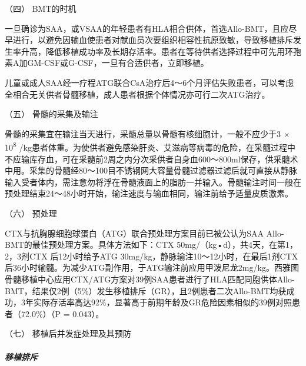 \hypertarget{text00089.htmlux5cux23CHP3-10-1-3-2-4}{}
（四） BMT的时机

一旦确诊为SAA，或VSAA的年轻患者有HLA相合供体，首选Allo-BMT，且应尽早进行，以避免因输血使患者对献血员次要组织相容性抗原致敏，导致移植排斥发生率升高，降低移植成功率及长期存活率。患者在等待供者选择过程中可先用环孢素A加GM-CSF或G-CSF，一旦有合适供者，立即移植。

儿童或成人SAA经一疗程ATG联合CsA治疗后4～6个月评估失败患者，可以考虑全相合无关供者骨髓移植，成人患者根据个体情况亦可行二次ATG治疗。

\hypertarget{text00089.htmlux5cux23CHP3-10-1-3-2-5}{}
（五） 骨髓的采集及输注

骨髓的采集宜在输注当天进行，采髓总量以骨髓有核细胞计，一般不应少于3 ×
10\textsuperscript{8}
/kg患者体重。为使供者避免感染肝炎、艾滋病等病毒的危险，在采髓过程中不应输库存血，可在采髓前2周之内分次采供者自身血600～800ml保存，供采髓术中用。采集的骨髓经80～100目不锈钢网大容量骨髓过滤器过滤后就可直接从静脉输入受者体内，需注意勿将浮在骨髓液面上的脂肪一并输入。骨髓输注时间一般在预处理结束24～48小时开始，输注速度与输血相同，输注前给予适量皮质激素。

\hypertarget{text00089.htmlux5cux23CHP3-10-1-3-2-6}{}
（六） 预处理

CTX与抗胸腺细胞球蛋白（ATG）联合预处理方案目前已被公认为SAA
Allo-BMT的最佳预处理方案。具体方法如下：CTX
50mg/（kg•d），共4天，在第1，2，3剂CTX 后12小时给予ATG
30mg/kg，静脉输注10～12小时，在最后1剂CTX后36小时输髓。为减少ATG副作用，于ATG输注前应用甲泼尼龙2mg/kg。西雅图骨髓移植中心应用CTX/ATG方案对39例SAA患者进行了HLA匹配同胞供体Allo-BMT，结果仅2例（5\%）发生移植排斥（GR），且2例患者二次Allo-BMT均获成功，3年实际存活率高达92\%，显著高于前期年龄及GR危险因素相似的39例对照患者（72.0\%）（P
= 0.043）。

\hypertarget{text00089.htmlux5cux23CHP3-10-1-3-2-7}{}
（七） 移植后并发症处理及其预防

\subparagraph{移植排斥}

